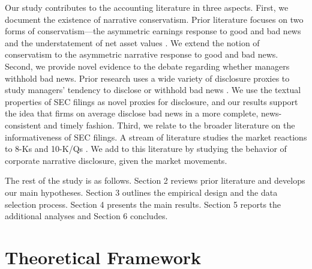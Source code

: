 \documentclass[letterpaper,12pt]{article}
\begin{document}
\begin{spacing}{1.5}
Our study contributes to the accounting literature in three aspects. First, we document the existence of narrative conservatism. Prior literature focuses on two forms of conservatism---the asymmetric earnings response to good and bad news and the understatement of net asset values \cite{basuConservatismPrincipleAsymmetric1997, ballEarningsQualityUK2005, beaverConditionalUnconditionalConservatism2005}. We extend the notion of conservatism to the asymmetric narrative response to good and bad news. 
Second, we provide novel evidence to the debate regarding whether managers withhold bad news. Prior research uses a wide variety of disclosure proxies to study managers' tendency to disclose or withhold bad news \cite{kasznikWarnNotWarn1995, kothariManagersWithholdBad2009, baoManagersDiscloseWithhold2019}. We use the textual properties of SEC filings as novel proxies for disclosure, and our results support the idea that firms on average disclose bad news in a more complete, news-consistent and timely fashion. Third, we relate to the broader literature on the informativeness of SEC filings. A stream of literature studies the market reactions to 8-Ks \cite{carterRelevanceForm8K1999, pinskerHasFirmsForm2006, lermanNewForm8K2010} and 10-K/Qs \cite{alfordExtensionsViolationsStatutory1994, liAnnualReportReadability2008, liInformationContentForwardLooking2010}. We add to this literature by studying the behavior of corporate narrative disclosure, given the market movements.

The rest of the study is as follows. Section 2 reviews prior literature and develops our main hypotheses. Section 3 outlines the empirical design and the data selection process. Section 4 presents the main results. Section 5 reports the additional analyses and Section 6 concludes.

\section{Theoretical Framework}

\end{spacing}
\end{document}
